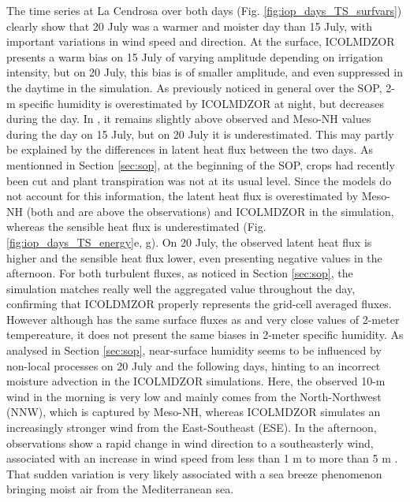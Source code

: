 The time series at La Cendrosa over both days (Fig. \ref{fig:iop_days_TS_surfvars}) clearly show that 20 July was a warmer and moister day than 15 July, with important variations in wind speed and direction.
At the surface, ICOLMDZOR presents a warm bias on 15 July of varying amplitude depending on irrigation intensity, but on 20 July, this bias is of smaller amplitude, and even suppressed in the daytime in the \irrboost simulation.
As previously noticed in general over the SOP, 2-m specific humidity is overestimated by ICOLMDZOR at night, but decreases during the day. In \irrboost, it remains slightly above observed and Meso-NH values during the day on 15 July, but on 20 July it is underestimated.
This may partly be explained by the differences in latent heat flux between the two days. As mentionned in Section \ref{sec:sop}, at the beginning of the SOP, crops had recently been cut and plant transpiration was not at its usual level.
Since the models do not account for this information, the latent heat flux is overestimated by Meso-NH (both \mesoexact and \mesomean are above the observations) and ICOLMDZOR in the \irrboost simulation, whereas the sensible heat flux is underestimated (Fig. \ref{fig:iop_days_TS_energy}e, g). 
On 20 July, the observed latent heat flux is higher and the sensible heat flux lower, even presenting negative values in the afternoon.
For both turbulent fluxes, as noticed in Section \ref{sec:sop}, the \irrboost simulation matches really well the \mesomean aggregated value throughout the day, confirming that ICOLDMZOR properly represents the grid-cell averaged fluxes.
However although \mesomean has the same surface fluxes as \irrboost and very close values of 2-meter tempereature, it does not present the same biases in 2-meter specific humidity. As analysed in Section \ref{sec:sop}, near-surface humidity seems to be influenced by non-local processes on 20 July and the following days, hinting to an incorrect moisture advection in the ICOLMDZOR simulations. 
Here, the observed 10-m wind in the morning is very low and mainly comes from the North-Northwest (NNW), which is captured by Meso-NH, whereas ICOLMDZOR simulates an increasingly stronger wind from the East-Southeast (ESE). 
In the afternoon, observations show a rapid change in wind direction to a southeasterly wind, associated with an increase in wind speed from less than 1 m \persec to more than 5 m \persec. That sudden variation is very likely associated with a sea breeze phenomenon bringing moist air from the Mediterranean sea. %

